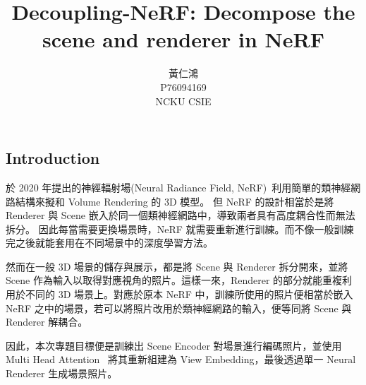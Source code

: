 \documentclass[10pt,twocolumn,letterpaper]{article}
\begin{document}
\begin{CJK}{UTF8}{bkai}
   \title{Decoupling-NeRF: Decompose the scene and renderer in NeRF}

   \author{
      黃仁鴻\\
      P76094169\\
      NCKU CSIE
   }

   \maketitle



   \section{Introduction}
   於 2020 年提出的神經輻射場(Neural Radiance Field,
   NeRF)~\cite{mildenhall2020nerf}利用簡單的類神經網路結構來擬和
   Volume Rendering 的 3D 模型。
   但 NeRF 的設計相當於是將 Renderer 與 Scene 嵌入於同一個類神經網路中，導致兩者具有高度耦合性而無法拆分。
   因此每當需要更換場景時，NeRF 就需要重新進行訓練。而不像一般訓練完之後就能套用在不同場景中的深度學習方法。

   然而在一般 3D 場景的儲存與展示，都是將 Scene 與 Renderer 拆分開來，並將 Scene
   作為輸入以取得對應視角的照片。這樣一來，Renderer 的部分就能重複利用於不同的
   3D 場景上。對應於原本 NeRF 中，訓練所使用的照片便相當於嵌入 NeRF
   之中的場景，若可以將照片改用於類神經網路的輸入，便等同將 Scene 與 Renderer 解耦合。

   因此，本次專題目標便是訓練出 Scene Encoder 對場景進行編碼照片，並使用 Multi Head Attention~\cite{AttentionIsAllYouNeed}
   將其重新組建為 View Embedding，最後透過單一 Neural Renderer 生成場景照片。



\end{CJK}
\end{document}
